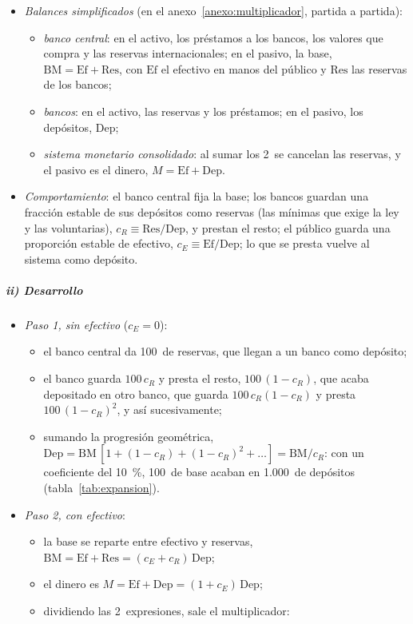 \documentclass[11pt]{article}
\begin{document}
\begin{itemize}
\item \emph{Balances simplificados} (en el anexo~\ref{anexo:multiplicador}, partida a partida):
  \begin{itemize}
  \item \emph{banco central}: en el activo, los préstamos a los bancos, los valores que compra y las reservas internacionales; en el pasivo, la base, $\mathrm{BM}=\mathrm{Ef}+\mathrm{Res}$, con $\mathrm{Ef}$ el efectivo en manos del público y $\mathrm{Res}$ las reservas de los bancos;
  \item \emph{bancos}: en el activo, las reservas y los préstamos; en el pasivo, los depósitos, $\mathrm{Dep}$;
  \item \emph{sistema monetario consolidado}: al sumar los 2~se cancelan las reservas, y el pasivo es el dinero, $M=\mathrm{Ef}+\mathrm{Dep}$.
  \end{itemize}
\item \emph{Comportamiento}: el banco central fija la base; los bancos guardan una fracción estable de sus depósitos como reservas (las mínimas que exige la ley y las voluntarias), $c_R\equiv\mathrm{Res}/\mathrm{Dep}$, y prestan el resto; el público guarda una proporción estable de efectivo, $c_E\equiv\mathrm{Ef}/\mathrm{Dep}$; lo que se presta vuelve al sistema como depósito.
\end{itemize}

\subparagraph{ii) Desarrollo}

\begin{itemize}
\item \emph{Paso 1, sin efectivo} ($c_E=0$):
  \begin{itemize}
  \item el banco central da 100~de reservas, que llegan a un banco como depósito;
  \item el banco guarda $100\,c_R$ y presta el resto, $100\,(1-c_R)$, que acaba depositado en otro banco, que guarda $100\,c_R(1-c_R)$ y presta $100\,(1-c_R)^2$, y así sucesivamente;
  \item sumando la progresión geométrica, $\mathrm{Dep}=\mathrm{BM}\,[1+(1-c_R)+(1-c_R)^2+\dots]=\mathrm{BM}/c_R$: con un coeficiente del 10~\%, 100~de base acaban en 1.000~de depósitos (tabla~\ref{tab:expansion}).
  \end{itemize}
\item \emph{Paso 2, con efectivo}:
  \begin{itemize}
  \item la base se reparte entre efectivo y reservas, $\mathrm{BM}=\mathrm{Ef}+\mathrm{Res}=(c_E+c_R)\,\mathrm{Dep}$;
  \item el dinero es $M=\mathrm{Ef}+\mathrm{Dep}=(1+c_E)\,\mathrm{Dep}$;
  \item dividiendo las 2~expresiones, sale el multiplicador:
  \end{itemize}
\end{itemize}
\end{document}

